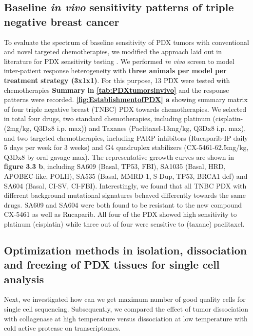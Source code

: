 \subsection{Baseline \textit{in vivo} sensitivity patterns of triple negative breast cancer}
To evaluate the spectrum of baseline sensitivity of PDX tumors with conventional and novel targeted chemotherapies, we modified the approach laid out in literature for PDX sensitivity testing \cite{gao2015high,migliardi2012inhibition}. We performed \textit{in vivo} screen to model inter-patient response heterogeneity with \textbf{three animals per model per treatment strategy (3x1x1)}. For this purpose, 13 PDX were tested with chemotherapies \textbf{Summary in \autoref{tab:PDXtumorsinvivo}} and the response patterns were recorded. 
\textbf{\autoref{fig:EstablishmentofPDX} a} showing summary matrix of four triple negative breast (TNBC) PDX towards chemotherapies. We selected in total four drugs, two standard chemotherapies, including platinum (cisplatin-(2mg/kg, Q3Dx8 i.p. max)) and Taxanes (Paclitaxel-13mg/kg, Q3Dx8 i.p. max), and two targeted chemotherapies, including PARP inhibitors (Rucaparib-IP daily 5 days per week for 3 weeks) and G4 quadruplex stabilizers (CX-5461-62.5mg/kg, Q3Dx8 by oral gavage max).  The representative grrowth curves are shown in \textbf{figure 3.3 b}, including SA609 (Basal, TP53, FBI), SA1035 (Basal, HRD, APOBEC-like, POLH), SA535 (Basal, MMRD-1, S-Dup, TP53, BRCA1 def) and SA604 (Basal, CI-SV, CI-FBI).
Interestingly, we found that all TNBC PDX with different background mutational signatures behaved differently towards the same drugs. SA609 and SA604 were both found to be resistant to the new compound CX-5461 as well as Rucaparib.
All four of the PDX showed high sensitivity to platinum (cisplatin) while three out of four were sensitive to (taxane) paclitaxel. 


\subsection{Optimization methods in isolation, dissociation and freezing of PDX tissues for single cell analysis}

Next, we investigated how can we get maximum number of good quality cells for single cell sequencing. Subsequently, we compared the effect of tumor dissociation with collagenase at high temperature versus dissociation at low temperature with cold active protease on transcriptomes.

